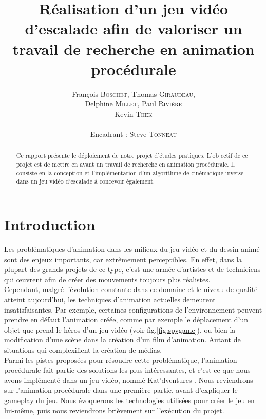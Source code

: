 \documentclass[a4paper,11pt]{article}
\title{ \textbf{Réalisation d'un jeu vidéo d'escalade afin de valoriser un travail de recherche en 
animation procédurale} }
\author{François \textsc{Boschet}, Thomas \textsc{Giraudeau}, \\
        Delphine \textsc{Millet}, Paul \textsc{Rivière} \\
        Kevin \textsc{Thek} \\
        \\
        Encadrant : Steve \textsc{Tonneau}}
\date{}                    %
\begin{document}
          

\maketitle                 %
\thispagestyle{empty}      %



\begin{abstract}
Ce rapport présente le déploiement de notre projet d'études pratiques. L'objectif de ce projet est de mettre en avant un travail de recherche en animation procédurale. Il consiste en la conception et l'implémentation d'un algorithme de cinématique inverse dans un jeu vidéo d'escalade à concevoir également.

\end{abstract} 


\section{Introduction}  

Les problématiques d'animation dans les milieux du jeu vidéo et du dessin animé sont des enjeux importants, car extrêmement perceptibles. En effet, dans la plupart des grands projets de ce type, c'est une armée d'artistes et de techniciens qui {\oe}uvrent afin de créer des mouvements toujours plus réalistes. \\
Cependant, malgré l'évolution constante dans ce domaine et le niveau de qualité atteint aujourd'hui, les techniques d'animation actuelles demeurent insatisfaisantes. Par exemple, certaines configurations de l'environnement peuvent prendre en défaut l'animation créée, comme par exemple le déplacement d'un objet que prend le héros d'un jeu vidéo (voir fig.\ref{fig:spygame}), ou bien la modification d'une scène dans la création d'un film d'animation. Autant de situations qui complexifient la création de médias.\\   
Parmi les pistes proposées pour résoudre cette problématique, l'animation procédurale fait partie des solutions les plus intéressantes, et c'est ce que nous avons implémenté dans un jeu vidéo, nommé \og Kat'dventures \fg{}  . Nous reviendrons sur l'animation procédurale dans une première partie, avant d'expliquer le gameplay du jeu. Nous évoquerons les technologies utilisées pour créer le jeu en lui-même, puis nous reviendrons brièvement sur l'exécution du projet.
\end{document}
